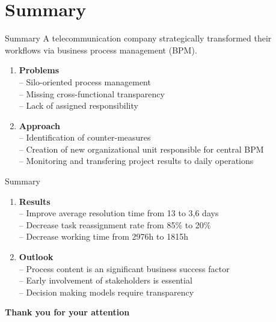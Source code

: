 \documentclass{beamer}
\begin{document}
\section{Summary}
\begin{frame}{Summary}
A telecommunication company strategically transformed their workflows via business process management (BPM).
    \begin{enumerate}[$\circ$]
        \item \textbf{Problems}\\-- Silo-oriented process management\\-- Missing cross-functional transparency\\-- Lack of assigned responsibility
        \item \textbf{Approach}\\-- Identification of counter-measures\\-- Creation of new organizational unit responsible for central BPM\\-- Monitoring and transfering project results to daily operations
    \end{enumerate}
\end{frame}

\begin{frame}{Summary}
    \begin{enumerate}[$\circ$]
        \item \textbf{Results}\\-- Improve average resolution time from 13 to 3,6 days\\-- Decrease task reassignment rate from 85\% to 20\%\\-- Decrease working time from 2976h to 1815h
        \item \textbf{Outlook}\\-- Process content is an significant business success factor\\-- Early involvement of stakeholders is essential\\-- Decision making models require transparency 
    \end{enumerate}
\end{frame}

\begin{frame}
    \centering \textbf{Thank you for your attention}
\end{frame}
\end{document}

